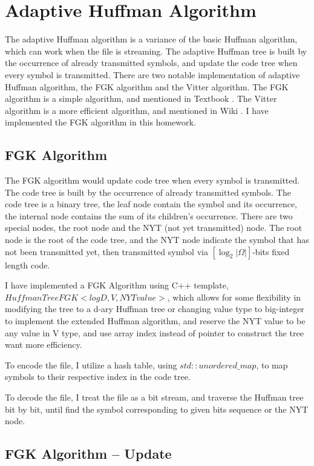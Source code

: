 \documentclass[a4paper,conference]{IEEEtran}
\begin{document}
\section{Adaptive Huffman Algorithm}

The adaptive Huffman algorithm is a variance of the basic Huffman algorithm, which can work when the file is streaming. The adaptive Huffman tree is built by the occurrence of already transmitted symbols, and update the code tree when every symbol is transmitted. There are two notable implementation of adaptive Huffman algorithm, the FGK algorithm and the Vitter algorithm. The FGK algorithm is a simple algorithm, and mentioned in Textbook \cite{Introduction to Data Compression}. The Vitter algorithm is a more efficient algorithm, and mentioned in Wiki \cite{Wiki Adaptive_Huffman_coding}. I have implemented the FGK algorithm in this homework.

\subsection{FGK Algorithm}

The FGK algorithm would update code tree when every symbol is transmitted. The code tree is built by the occurrence of already transmitted symbols. The code tree is a binary tree, the leaf node contain the symbol and its occurrence, the internal node contains the sum of its children's occurrence. There are two special nodes, the root node and the NYT (not yet transmitted) node. The root node is the root of the code tree, and the NYT node indicate the symbol that has not been transmitted yet, then transmitted symbol via $[ \log_2{|\Omega|} ]$-bits fixed length code.

I have implemented a FGK Algorithm using C++ template, $HuffmanTreeFGK<logD, V, NYTvalue>$, which allows for some flexibility in modifying the tree to a d-ary Huffman tree or changing value type to big-integer to implement the extended Huffman algorithm, and reserve the NYT value to be any value in V type, and use array index instead of pointer to construct the tree want more efficiency.

To encode the file, I utilize a hash table, using $std::unordered\_map$, to map symbols to their respective index in the code tree.

To decode the file, I treat the file as a bit stream, and traverse the Huffman tree bit by bit, until find the symbol corresponding to given bits sequence or the NYT node.

\subsection{FGK Algorithm -- Update}
\end{document}
